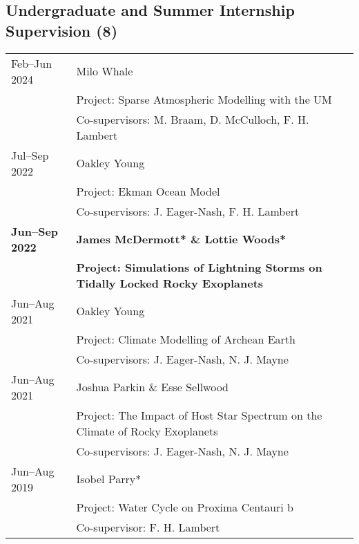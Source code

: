 \documentclass[a4paper, 11pt]{article}
\newcommand{\highlightbold}[1]{\textbf{\textcolor{exeter_bright_green}{#1}}}
\begin{document}
\subsection*{Undergraduate and Summer Internship Supervision (8)}
\begin{tabularx}{\linewidth}{@{}l X@{}}
Feb--Jun 2024 & Milo Whale \\
              & Project: Sparse Atmospheric Modelling with the UM \\
              & Co-supervisors: M. Braam, D. McCulloch, F. H. Lambert \\
Jul--Sep 2022 & Oakley Young \\
              & Project: Ekman Ocean Model \\
              & Co-supervisors: J. Eager-Nash, F. H. Lambert \\
\highlightbold{Jun--Sep 2022} & \highlightbold{James McDermott* \& Lottie Woods*} \\
                          & \highlightbold{Project: Simulations of Lightning Storms on Tidally Locked Rocky Exoplanets} \\
Jun--Aug 2021 & Oakley Young \\
              & Project: Climate Modelling of Archean Earth \\
              & Co-supervisors: J. Eager-Nash, N. J. Mayne \\
Jun--Aug 2021 & Joshua Parkin \& Esse Sellwood \\
              & Project: The Impact of Host Star Spectrum on the Climate of Rocky Exoplanets \\
              & Co-supervisors: J. Eager-Nash, N. J. Mayne \\
Jun--Aug 2019 & Isobel Parry* \\
              & Project: Water Cycle on Proxima Centauri b \\
              & Co-supervisor: F. H. Lambert \\
\end{tabularx}

\end{document}
